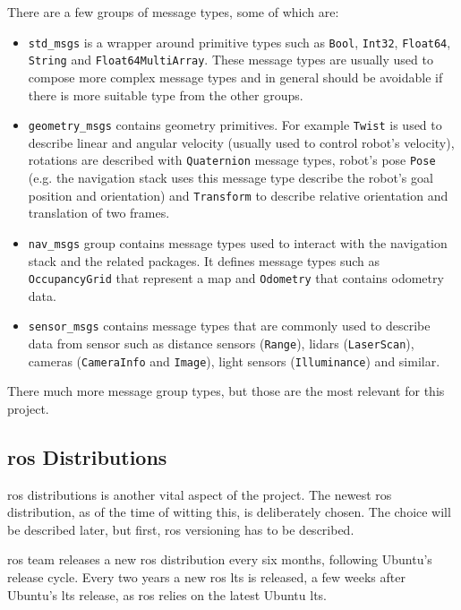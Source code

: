 There are a few groups of message types, some of which are:
\begin{itemize}
    \item \texttt{std\_msgs} is a wrapper around primitive types such as \texttt{Bool}, \texttt{Int32}, \texttt{Float64}, \texttt{String} and \texttt{Float64MultiArray}.
    These message types are usually used to compose more complex message types and in general should be avoidable if there is more suitable type from the other groups.
    \item \texttt{geometry\_msgs} contains geometry primitives.
    For example \texttt{Twist} is used to describe linear and angular velocity (usually used to control robot's velocity), rotations are described with \texttt{Quaternion} message types, robot's pose \texttt{Pose} (e.g. the navigation stack uses this message type describe the robot's goal position and orientation) and \texttt{Transform} to describe relative orientation and translation of two frames.
    \item \texttt{nav\_msgs} group contains message types used to interact with the navigation stack and the related packages.
    It defines message types such as \texttt{OccupancyGrid} that represent a map and \texttt{Odometry} that contains odometry data. 
    \item \texttt{sensor\_msgs} contains message types that are commonly used to describe data from sensor such as distance sensors (\texttt{Range}), \acsp{lidar} (\texttt{LaserScan}), cameras (\texttt{CameraInfo} and \texttt{Image}), light sensors (\texttt{Illuminance}) and similar. 
\end{itemize}

There much more message group types, but those are the most relevant for this project.

\subsection{\ac{ros} Distributions}

\ac{ros} distributions is another vital aspect of the project.
The newest \ac{ros} distribution, as of the time of witting this, is deliberately chosen.
The choice will be described later, but first, \ac{ros} versioning has to be described.

\ac{ros} team releases a new \ac{ros} distribution every six months, following Ubuntu's release cycle.
Every two years a new \ac{ros} \ac{lts} is released,
a few weeks after Ubuntu's \ac{lts} release, as \ac{ros} relies on the latest Ubuntu \ac{lts}.

